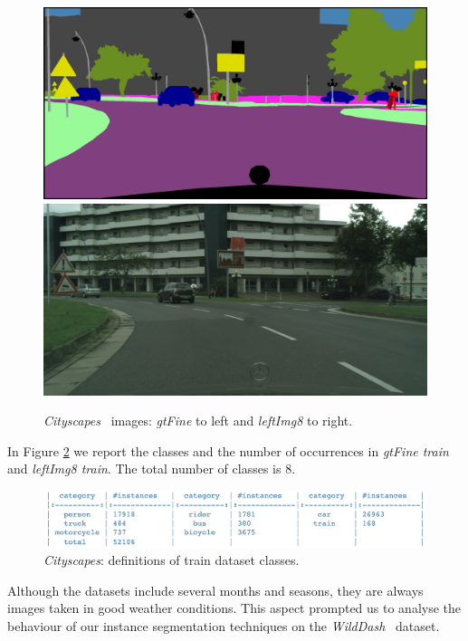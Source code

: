 \documentclass[10pt,twocolumn,letterpaper]{article}
\begin{document}
\begin{figure}[H]
\centering
 \includegraphics[width=0.41\linewidth]{./image/gtFine.png} \quad \includegraphics[width=0.41\linewidth]{./image/leftImg8.png}
  \caption{\textit{Cityscapes}~\cite{cityscapes} images: \textit{gtFine} to left and \textit{leftImg8} to right.}
 \label{fig:image_gtfine}
\noindent
\end{figure}
In Figure \ref{fig:class_definitions_city} we report the classes and the number of occurrences in \textit{gtFine train} and \textit{leftImg8 train}. The total number of classes is 8.
\begin{figure}[H]
\centering
  \includegraphics[width=0.95\linewidth]{./image/city_class} 
  \caption{\textit{Cityscapes}: definitions of train dataset classes.} %
  \label{fig:class_definitions_city}
\noindent
\end{figure}
Although the datasets include several months and seasons, they are always images taken in good weather conditions. This aspect prompted us to analyse the behaviour of our instance segmentation techniques on the \textit{WildDash}~\cite{wildDash} dataset.
\end{document}
